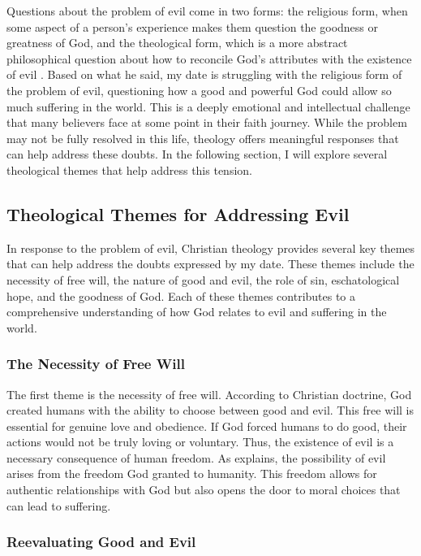 \documentclass[stu,12pt,floatsintext]{apa7}
\begin{document}
Questions about the problem of evil come in two forms: the religious form, when some aspect of a person's experience makes them question the goodness or greatness of God, and the theological form, which is a more abstract philosophical question about how to reconcile God's attributes with the existence of evil \parencite[chapter 15]{ericksonIntroducingChristianDoctrine2015}. Based on what he said, my date is struggling with the religious form of the problem of evil, questioning how a good and powerful God could allow so much suffering in the world. This is a deeply emotional and intellectual challenge that many believers face at some point in their faith journey. While the problem may not be fully resolved in this life, theology offers meaningful responses that can help address these doubts. In the following section, I will explore several theological themes that help address this tension.

\subsection{Theological Themes for Addressing Evil}

In response to the problem of evil, Christian theology provides several key themes that can help address the doubts expressed by my date. These themes include the necessity of free will, the nature of good and evil, the role of sin, eschatological hope, and the goodness of God. Each of these themes contributes to a comprehensive understanding of how God relates to evil and suffering in the world.

\subsubsection{The Necessity of Free Will}

The first theme is the necessity of free will. According to Christian doctrine, God created humans with the ability to choose between good and evil. This free will is essential for genuine love and obedience. If God forced humans to do good, their actions would not be truly loving or voluntary. Thus, the existence of evil is a necessary consequence of human freedom. As \textcite[chapter 15]{ericksonIntroducingChristianDoctrine2015} explains, the possibility of evil arises from the freedom God granted to humanity. This freedom allows for authentic relationships with God but also opens the door to moral choices that can lead to suffering.

\subsubsection{Reevaluating Good and Evil}
\end{document}
